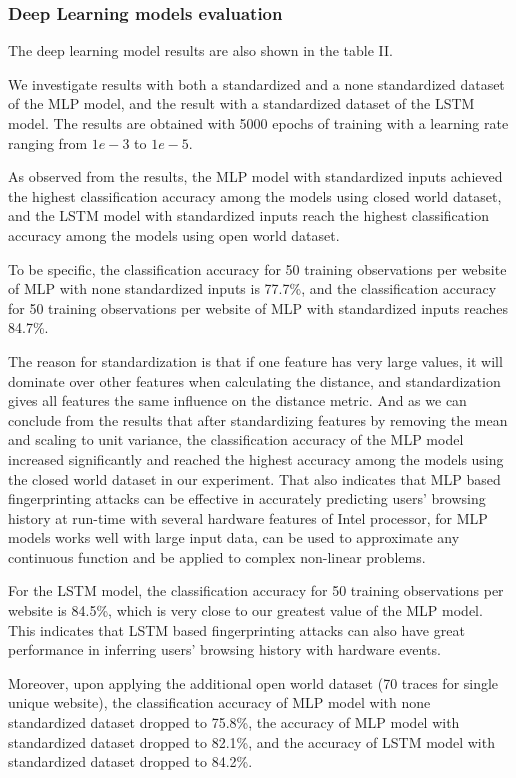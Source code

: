 \documentclass[conference]{IEEEtran}
\begin{document}
\subsubsection{Deep Learning models evaluation}
The deep learning model results are also shown in the table II.
\par We investigate results with both a standardized and a none standardized dataset of the MLP model, and the result with a standardized dataset of the LSTM model. The results are obtained with 5000 epochs of training with a learning rate ranging from $1e-3$ to $1e-5$.
\par As observed from the results, the MLP model with standardized inputs achieved the highest classification accuracy among the models using closed world dataset, and the LSTM model with standardized inputs reach the highest classification accuracy among the models using open world dataset.
\par To be specific, the classification accuracy for 50 training observations per website of MLP with none standardized inputs is 77.7\%, and the classification accuracy for 50 training observations per website of MLP with standardized inputs reaches 84.7\%. 
\par The reason for standardization is that if one feature has very large values, it will dominate over other features when calculating the distance, and standardization gives all features the same influence on the distance metric. And as we can conclude from the results that after standardizing features by removing the mean and scaling to unit variance, the classification accuracy of the MLP model increased significantly and reached the highest accuracy among the models using the closed world dataset in our experiment. That also indicates that MLP based fingerprinting attacks can be effective in accurately predicting users’ browsing history at run-time with several hardware features of Intel processor, for MLP models works well with large input data, can be used to approximate any continuous function and be applied to complex non-linear problems.
\par For the LSTM model, the classification accuracy for 50 training observations per website is 84.5\%, which is very close to our greatest value of the MLP model. This indicates that LSTM based fingerprinting attacks can also have great performance in inferring users’ browsing history with hardware events.
\par Moreover, upon applying the additional open world dataset (70 traces for single unique website), the classification accuracy of MLP model with none standardized dataset dropped to 75.8\%, the accuracy of MLP model with standardized dataset dropped to 82.1\%, and the accuracy of LSTM model with standardized dataset dropped to 84.2\%.
\end{document}
